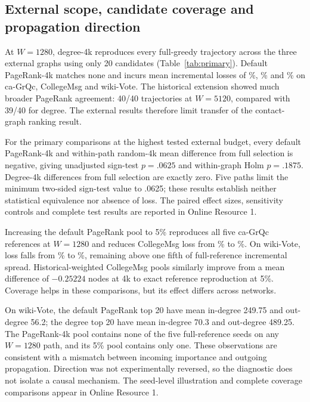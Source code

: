 \documentclass[smallextended]{svjour3}
\begin{document}
\subsection{External scope, candidate coverage and propagation direction}
At $W=1280$, degree-4k reproduces every full-greedy trajectory across the three external graphs using only 20 candidates (Table~\ref{tab:primary}). Default PageRank-4k matches none and incurs mean incremental losses of \GrqcPRLoss{}\%, \CollegePRLoss{}\% and \WikiPRLoss{}\% on ca-GrQc, CollegeMsg and wiki-Vote. The historical extension showed much broader PageRank agreement: 40/40 trajectories at $W=5120$, compared with 39/40 for degree. The external results therefore limit transfer of the contact-graph ranking result.


For the primary comparisons at the highest tested external budget, every default PageRank-4k and within-path random-4k mean difference from full selection is negative, giving unadjusted sign-test $p=.0625$ and within-graph Holm $p=.1875$. Degree-4k differences from full selection are exactly zero. Five paths limit the minimum two-sided sign-test value to .0625; these results establish neither statistical equivalence nor absence of loss. The paired effect sizes, sensitivity controls and complete test results are reported in Online Resource 1.

Increasing the default PageRank pool to 5\% reproduces all five ca-GrQc references at $W=1280$ and reduces CollegeMsg loss from \CollegePRLoss{}\% to \CollegePRfiveLoss{}\%. On wiki-Vote, loss falls from \WikiPRLoss{}\% to \WikiPRfiveLoss{}\%, remaining above one fifth of full-reference incremental spread. Historical-weighted CollegeMsg pools similarly improve from a mean difference of $-0.25224$ nodes at 4k to exact reference reproduction at 5\%. Coverage helps in these comparisons, but its effect differs across networks.

On wiki-Vote, the default PageRank top 20 have mean in-degree 249.75 and out-degree 56.2; the degree top 20 have mean in-degree 70.3 and out-degree 489.25. The PageRank-4k pool contains none of the five full-reference seeds on any $W=1280$ path, and its 5\% pool contains only one. These observations are consistent with a mismatch between incoming importance and outgoing propagation. Direction was not experimentally reversed, so the diagnostic does not isolate a causal mechanism. The seed-level illustration and complete coverage comparisons appear in Online Resource 1.
\end{document}
